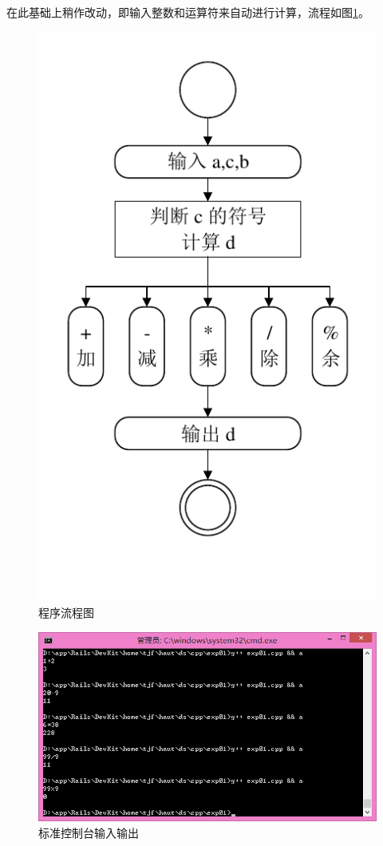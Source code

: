在此基础上稍作改动，即输入整数和运算符来自动进行计算，流程如图\ref{aly01}。
\begin{figure}[htp]
\centering
\includegraphics{exp01/exp01.pdf}
\caption{\label{aly01}程序流程图}
\end{figure}
\begin{figure}[htp]
\centering
\includegraphics[width=\textwidth]{exp01/exp01.png}
\caption{\label{out01}标准控制台输入输出}
\end{figure}
